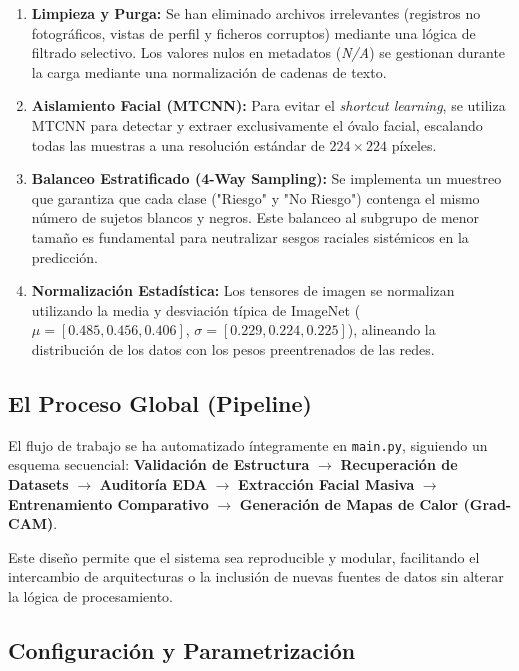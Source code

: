 \begin{enumerate}
    \item \textbf{Limpieza y Purga:} Se han eliminado archivos irrelevantes (registros no fotográficos, vistas de perfil y ficheros corruptos) mediante una lógica de filtrado selectivo. Los valores nulos en metadatos (\textit{N/A}) se gestionan durante la carga mediante una normalización de cadenas de texto.
    \item \textbf{Aislamiento Facial (MTCNN):} Para evitar el \textit{shortcut learning}, se utiliza MTCNN para detectar y extraer exclusivamente el óvalo facial, escalando todas las muestras a una resolución estándar de $224 \times 224$ píxeles.
    \item \textbf{Balanceo Estratificado (4-Way Sampling):} Se implementa un muestreo que garantiza que cada clase ("Riesgo" y "No Riesgo") contenga el mismo número de sujetos blancos y negros. Este balanceo al subgrupo de menor tamaño es fundamental para neutralizar sesgos raciales sistémicos en la predicción.
    \item \textbf{Normalización Estadística:} Los tensores de imagen se normalizan utilizando la media y desviación típica de ImageNet ($\mu=[0.485, 0.456, 0.406]$, $\sigma=[0.229, 0.224, 0.225]$), alineando la distribución de los datos con los pesos preentrenados de las redes.
\end{enumerate}

\subsection{El Proceso Global (Pipeline)}

El flujo de trabajo se ha automatizado íntegramente en \texttt{main.py}, siguiendo un esquema secuencial:
\textbf{Validación de Estructura} $\rightarrow$ \textbf{Recuperación de Datasets} $\rightarrow$ \textbf{Auditoría EDA} $\rightarrow$ \textbf{Extracción Facial Masiva} $\rightarrow$ \textbf{Entrenamiento Comparativo} $\rightarrow$ \textbf{Generación de Mapas de Calor (Grad-CAM)}.

Este diseño permite que el sistema sea reproducible y modular, facilitando el intercambio de arquitecturas o la inclusión de nuevas fuentes de datos sin alterar la lógica de procesamiento.

\subsection{Configuración y Parametrización}

